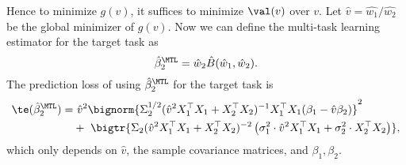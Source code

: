 Hence to minimize $g(v)$, it suffices to minimize $\val(v)$ over $v$.
Let $\hat v=\hat{w_1}/\hat{w_2}$ be the global minimizer of $g(v)$.
Now we can define the multi-task learning estimator for the target task as
	\[ \hat{\beta}_2^{\MTL} = \hat{w}_{2}\hat{B}(\hat{w}_1, \hat{w}_2) .\]
The prediction loss of using $\hat{\beta}_2^{\MTL}$ for the target task is
\begin{align}
	\te(\hat{\beta}_2^{\MTL}) =&~ \hat{v}^2 \bignorm{\Sigma_2^{1/2}(\hat{v}^2 X_1^{\top}X_1 + X_2^{\top}X_2)^{-1} X_1^{\top}X_1 (\beta_1 - \hat{v} \beta_2)}^2 \nonumber \\
			&+~  \bigtr{\Sigma_2(\hat{v}^2 X_1^{\top}X_1 + X_2^{\top}X_2)^{-2}\left(\sigma_1^2 \cdot \hat v^2  X_1^{\top}X_1 + \sigma_2^2  \cdot X_2^{\top}X_2\right) }, \label{eq_te_mtl_2task}
\end{align}
which only depends on $\hat v$, the sample covariance matrices, and $\beta_1,\beta_2$.
\fi





